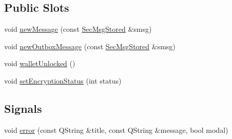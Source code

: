 \subsection*{Public Slots}
\begin{DoxyCompactItemize}
\item 
void \hyperlink{class_message_model_ad6a392da2be132233531d54e14383dfb}{new\+Message} (const \hyperlink{class_sec_msg_stored}{Sec\+Msg\+Stored} \&smsg)
\item 
void \hyperlink{class_message_model_a7a1396e1047438ce30c8a3a1373d0dfd}{new\+Outbox\+Message} (const \hyperlink{class_sec_msg_stored}{Sec\+Msg\+Stored} \&smsg)
\item 
void \hyperlink{class_message_model_ad4f38a637dda717acc6b3bcec2b8f23f}{wallet\+Unlocked} ()
\item 
void \hyperlink{class_message_model_a4e1d19da83fffaea5883ba3771d62949}{set\+Encryption\+Status} (int status)
\end{DoxyCompactItemize}
\subsection*{Signals}
\begin{DoxyCompactItemize}
\item 
void \hyperlink{class_message_model_a506804d291f1cae01b8fbc22c0a12693}{error} (const Q\+String \&title, const Q\+String \&message, bool modal)
\end{DoxyCompactItemize}
